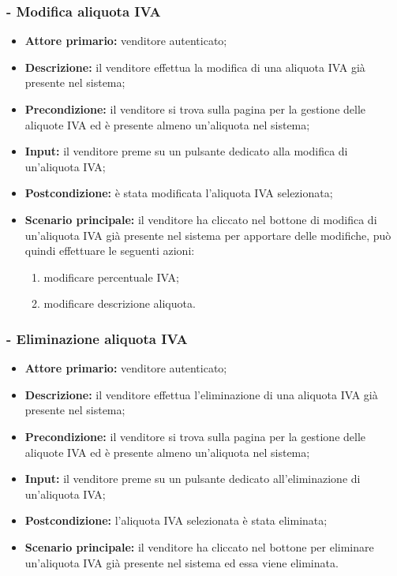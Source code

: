 \subsubsection{- Modifica aliquota IVA}
\begin{itemize}
    \item \textbf{Attore primario:} venditore autenticato;
    \item \textbf{Descrizione:} il venditore effettua la modifica di una aliquota IVA già presente nel sistema;
    \item \textbf{Precondizione:} il venditore si trova sulla pagina per la gestione delle aliquote IVA ed è presente almeno un'aliquota nel sistema;
    \item \textbf{Input:} il venditore preme su un pulsante dedicato alla modifica di un'aliquota IVA;
    \item \textbf{Postcondizione:} è stata modificata l'aliquota IVA selezionata;
    \item \textbf{Scenario principale:} il venditore ha cliccato nel bottone di modifica di un'aliquota IVA già presente nel sistema per apportare delle modifiche, può quindi effettuare le seguenti azioni:
          \begin{enumerate}
              \item modificare percentuale IVA;
              \item modificare descrizione aliquota.
          \end{enumerate}
\end{itemize}

\stepsubUserCase
\subsubsection{- Eliminazione aliquota IVA}
\begin{itemize}
    \item \textbf{Attore primario:} venditore autenticato;
    \item \textbf{Descrizione:} il venditore effettua l'eliminazione di una aliquota IVA già presente nel sistema;
    \item \textbf{Precondizione:} il venditore si trova sulla pagina per la gestione delle aliquote IVA ed è presente almeno un'aliquota nel sistema;
    \item \textbf{Input:} il venditore preme su un pulsante dedicato all'eliminazione di un'aliquota IVA;
    \item \textbf{Postcondizione:} l'aliquota IVA selezionata è stata eliminata;
    \item \textbf{Scenario principale:} il venditore ha cliccato nel bottone per eliminare un'aliquota IVA già presente nel sistema ed essa viene eliminata.
\end{itemize}

